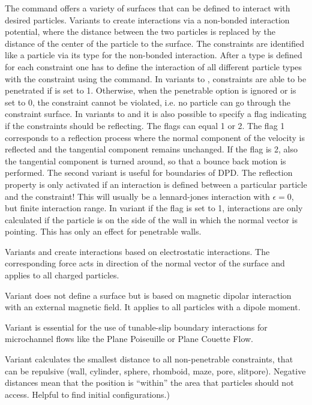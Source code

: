 The  command offers a variety of surfaces that can be
defined to interact with desired particles. Variants  to 
create interactions via a non-bonded interaction potential, where the distance
between the two particles is replaced by the
distance of the center of the particle to the surface. The constraints are
identified like a particle via its type for the non-bonded interaction. 
After a type is defined for each constraint one has
to define
the interaction of all different particle types with the constraint using
the  command. In variants  to , constraints
 are able to be penetrated if  is set to 1. Otherwise, when the
 penetrable option is ignored or  is set to 0, the constraint
 cannot be violated, i.e. no particle can go through the constraint surface.
 In variants  to  and  it is also possible to specify a flag 
 indicating if the constraints should be reflecting. The flags can equal 1 or 2.
 The flag 1 corresponds to a reflection process where the normal component of the 
 velocity is reflected and the tangential component remains unchanged. If the
 flag is 2, also the tangential component is turned around, so that a bounce back
 motion is performed. The second variant is useful for boundaries of DPD.
 The reflection property is only activated if an interaction is defined between
 a particular particle and the constraint! This will usually be a lennard-jones
 interaction with $\epsilon=0$, but finite interaction range.
 In variant  if the  flag is set to 1, interactions are
 only calculated if the particle is on the side of the wall in which the normal
 vector is pointing. This has only an effect for penetrable walls.

Variants  and  create interactions based on electrostatic
interactions. The corresponding force acts in direction of the normal vector of the
surface and applies to all charged particles.

Variant  does not define a surface but is based on magnetic
dipolar interaction with an external magnetic field. It applies to all particles
with a dipole moment.

Variant  is essential for the use of tunable-slip boundary
interactions for microchannel flows like the Plane Poiseuille or Plane Couette
Flow.

Variant  calculates the smallest distance to all non-penetrable
constraints, that can be repulsive (wall, cylinder, sphere, rhomboid, maze, pore, slitpore).
Negative distances mean that the position is ``within'' the area that
particles should not access. Helpful to find initial configurations.) 

